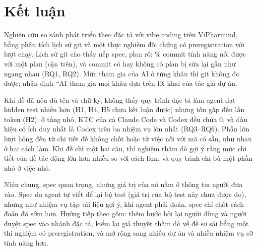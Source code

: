 \section{Kết luận}\label{sec:conclusion}

Nghiên cứu so sánh phát triển theo đặc tả với vibe coding trên ViPharmind, bằng phân tích lịch sử git
và một thực nghiệm đối chứng có preregistration với \NumResRuns{} lượt chạy. Lịch sử git cho thấy nếp spec, plan rõ:
\NumFeatWithPlanPct{}\% commit tính năng nối được với một plan (cận trên), và commit có hay không có plan
bị sửa lại gần như ngang nhau (RQ1, RQ2). Mức tham gia của AI ở từng khâu thì git không đo được; nhận định
``AI tham gia mọi khâu dựa trên lời khai của tác giả dự án.

Khi đề đã nêu đủ tên và chữ ký, không thấy quy trình đặc tả làm agent đạt hidden test nhiều hơn (H1, H4, H5 chưa kết
luận được) nhưng tốn gấp \NumResTokenRatioMin{} đến \NumResTokenRatioMax{} lần token (H2); ở tầng nhỏ, KTC của cả
Claude Code và Codex đều chứa 0, và dấu hiệu có ích duy nhất là Codex trên ba nhiệm vụ lớn nhất (RQ3--RQ6). Phần lớn lượt hỏng
đến từ chi tiết đề không chốt hoặc từ việc nối với mã có sẵn, như nhau ở hai cách làm. Khi đề chỉ một hai câu,
thí nghiệm thăm dò gợi ý rằng mức chi tiết của đề tác động lớn hơn nhiều so với cách làm, và quy trình chỉ bù
một phần nhỏ ở việc nhỏ.

Nhìn chung, spec quan trọng, nhưng giá trị của nó nằm ở thông tin người đưa vào. Spec do agent tự viết để lại
bộ test (giá trị của bộ test này chưa được đo), nhưng như nhiệm vụ tập tài liệu gợi ý, khi agent phải đoán, spec chỉ
chốt cách đoán đó sớm hơn. Hướng tiếp theo
gồm: thêm bước hỏi lại người dùng và người duyệt spec vào nhánh đặc tả, kiểm lại giả thuyết thăm dò về đề sơ sài bằng một
thí nghiệm có preregistration, và mở rộng sang nhiều dự án và nhiều nhiệm vụ cỡ tính năng hơn.
